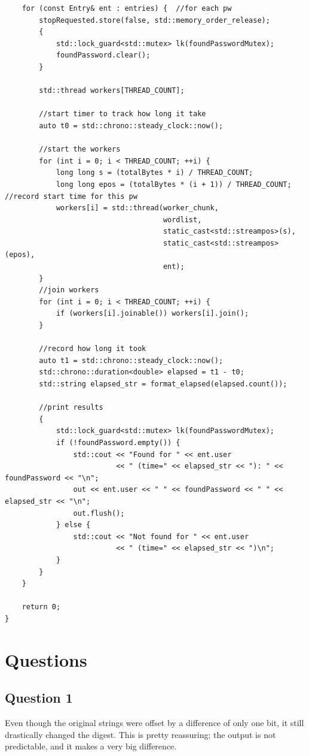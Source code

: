 \documentclass[11pt]{article}
\begin{document}
\begin{lstlisting}
    for (const Entry& ent : entries) {  //for each pw
        stopRequested.store(false, std::memory_order_release);
        {
            std::lock_guard<std::mutex> lk(foundPasswordMutex);
            foundPassword.clear();
        }

        std::thread workers[THREAD_COUNT];

        //start timer to track how long it take
        auto t0 = std::chrono::steady_clock::now();

        //start the workers
        for (int i = 0; i < THREAD_COUNT; ++i) {
            long long s = (totalBytes * i) / THREAD_COUNT;
            long long epos = (totalBytes * (i + 1)) / THREAD_COUNT; //record start time for this pw
            workers[i] = std::thread(worker_chunk,
                                     wordlist,
                                     static_cast<std::streampos>(s),
                                     static_cast<std::streampos>(epos),
                                     ent); 
        }
        //join workers
        for (int i = 0; i < THREAD_COUNT; ++i) {
            if (workers[i].joinable()) workers[i].join();
        }

        //record how long it took
        auto t1 = std::chrono::steady_clock::now();
        std::chrono::duration<double> elapsed = t1 - t0;
        std::string elapsed_str = format_elapsed(elapsed.count());

        //print results
        {
            std::lock_guard<std::mutex> lk(foundPasswordMutex);
            if (!foundPassword.empty()) {
                std::cout << "Found for " << ent.user
                          << " (time=" << elapsed_str << "): " << foundPassword << "\n";
                out << ent.user << " " << foundPassword << " " << elapsed_str << "\n";
                out.flush();
            } else {
                std::cout << "Not found for " << ent.user
                          << " (time=" << elapsed_str << ")\n";
            }
        }
    }

    return 0;
}

\end{lstlisting}


\section*{Questions}
\subsection*{Question 1}
Even though the original strings were offset by a difference of only one bit, it still drastically changed the digest. This is pretty reassuring; the output is not predictable, and it makes a very big difference.
\end{document}
